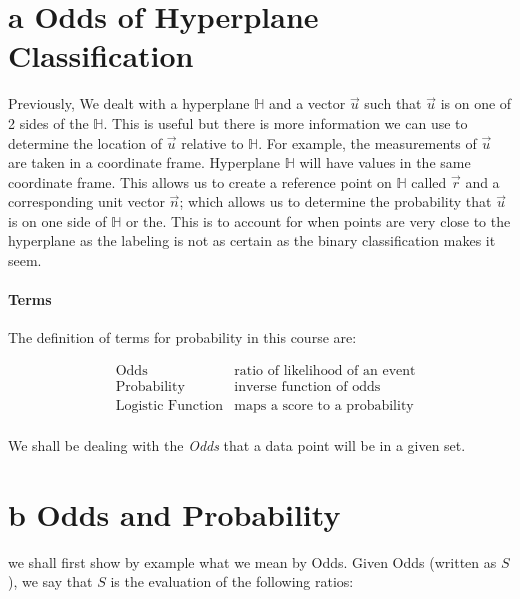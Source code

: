 \documentclass[12pt]{book}
\title{\coursetitle\linebreak\lecturename}
\author{\\Cain Susko\\ 
           \\ \\ \\
      Queen's University 
    \\School of Computing\\}
\begin{document}
\begin{titlepage}
        \maketitle
\end{titlepage}


\section*{a Odds of Hyperplane Classification}
Previously, We dealt with a hyperplane $\mathbb{H}$ and a vector $\vec u$ such 
that $\vec u$ is on one of 2 sides of the $\mathbb{H}$. This is useful
but there is more information we can use to determine the location of $\vec u$ 
relative to $\mathbb{H}$.
For example, the measurements of $\vec u$ are taken in a coordinate frame. 
Hyperplane $\mathbb{H}$ will have values in the same coordinate frame. This 
allows us to create a reference point on $\mathbb{H}$ called $\vec r$ and
a corresponding unit vector $\vec n$; which allows us to determine the 
probability that $\vec u$ is on one side of $\mathbb{H}$ or the.
This is to account for when points are very
close to the hyperplane as the labeling is not as certain as the binary
classification makes it seem.

\paragraph{Terms}
The definition of terms for probability in this course are:

\begin{align*}
        &\text{Odds} &\text{ratio of likelihood of an event}\\
        &\text{Probability} &\text{inverse function of odds}\\
        &\text{Logistic Function} &\text{maps a score to a probability}\\
\end{align*}

We shall be dealing with the \textit{Odds} that a data point will be in a given 
set.

\section*{b Odds and Probability}
we shall first show by example what we mean by Odds. Given Odds (written as 
$S$), we say that $S$ is the evaluation of the following ratios:
\end{document}
